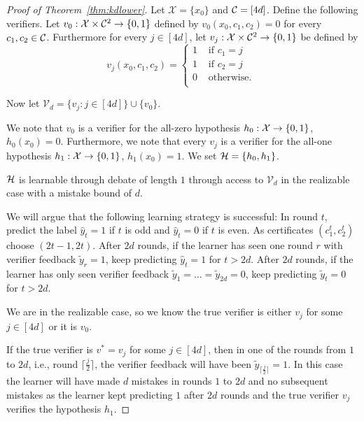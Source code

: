 \documentclass[11pt,letterpaper]{article}
\theoremstyle{definition}
\theoremstyle{plain}
\begin{document}
\begin{proof}[Proof of Theorem~\ref{thm:kdlower}]


Let $\mathcal{X}=\{x_0\}$ and ${{\mathcal C}} = [4d]$.
Define the following verifiers. Let $v_0: {\mathcal X} \times {{\mathcal C}}^2 \to \{0,1\}$ defined by  $v_0(x_0,c_1,c_2) = 0 $ for every $c_1, c_2 \in {{\mathcal C}}$.
Furthermore for every $j \in [4d]$, let $v_j: {\mathcal X} \times {{\mathcal C}}^2 \to \{0,1\}$ be defined by 
\[v_j (x_0, c_1, c_2) = \begin{cases}
    1 & \text{ if } c_1=j \\
    1 & \text{ if } c_2=j \\
        0 & \text{ otherwise. } \\
\end{cases}\]

Now let $\mathcal{V}_d= \{v_j : j \in [4d] \} \cup \{v_0\}$.

We note that $v_0$ is a verifier for the all-zero hypothesis $h_0: {\mathcal X} \to \{0,1\}$, $h_0(x_0) = 0$.
Furthermore, we note that every $v_j$ is a verifier for the all-one hypothesis $h_1: {\mathcal X} \to \{0,1\}$, $h_1(x_0) = 1$. We set ${{\mathcal H}} = \{h_0, h_1\}$.

\begin{claim}
 ${{\mathcal H}}$ is learnable through debate of length $1$ through access to $\mathcal{V}_d$ in the realizable case with a mistake bound of $d$.
\end{claim}
We will argue that the following learning strategy is successful: In round $t$, predict the label $\hat{y}_t= 1$ if $t$ is odd and $\hat{y}_t= 0$ if $t$ is even. As certificates $(c_1^t, c_2^t)$ choose $(2t-1,2t)$.
After $2d$ rounds, if the learner has seen one round $r$ with verifier feedback $\tilde{y}_r = 1$, keep predicting $\hat{y}_t = 1$ for $t > 2d$.
After $2d$ rounds, if the learner has only seen verifier feedback $\tilde{y}_1 = \dots = \tilde{y}_{2d} = 0$, keep predicting $\tilde{y}_t = 0$ for $t > 2d$.

We are in the realizable case, so we know the true verifier is either $v_j$ for some $j\in [4d]$ or it is $v_0$.

If the true verifier is $v^* = v_j$ for some $j\in [4d]$, then in one of the rounds from $1$ to $2d$, i.e., round $\lceil \frac{j}{2}\rceil$, the verifier feedback will have been $\tilde{y}_{\lceil\frac{j}{2}\rceil} =1$.
In this case the learner will have made $d$ mistakes in rounds $1$ to $2d$ and no subsequent mistakes as the learner kept predicting $1$ after $2d$ rounds and the true verifier $v_j$ verifies the hypothesis $h_1$.


\end{proof}
\end{document}
